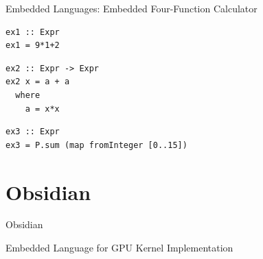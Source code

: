\documentclass[xcolor=dvipsnames]{beamer}
\begin{document}
%
\begin{frame}[fragile]{Embedded Languages: {\small Embedded Four-Function Calculator}} 

\begin{block}{}
\begin{verbatim} 
ex1 :: Expr
ex1 = 9*1+2
\end{verbatim}  
\end{block} 

\pause
\begin{block}{}
\begin{verbatim} 
ex2 :: Expr -> Expr
ex2 x = a + a 
  where
    a = x*x
\end{verbatim}  
\end{block} 

\pause
\begin{block}{}
\begin{verbatim} 
ex3 :: Expr
ex3 = P.sum (map fromInteger [0..15])
\end{verbatim}  
\end{block} 

\end{frame} 


%
\section{Obsidian}

%



\begin{frame}{Obsidian} 
  
  \begin{center}
  {\Large Embedded Language for GPU Kernel Implementation}
  \end{center}
      
\end{frame} 
\end{document}
